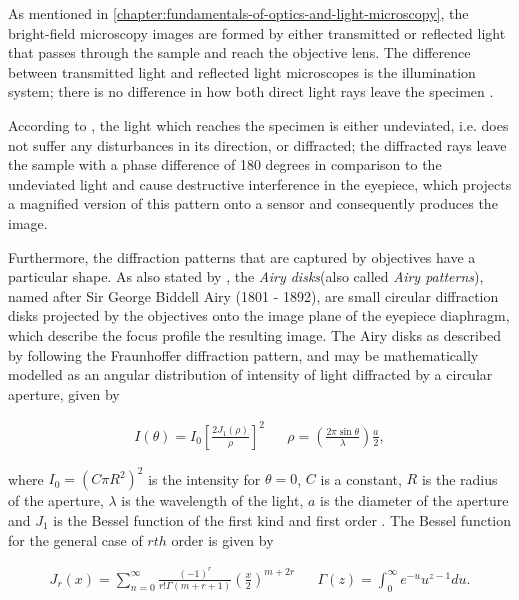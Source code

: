 As mentioned in \autoref{chapter:fundamentals-of-optics-and-light-microscopy}, the bright-field microscopy images are formed by either transmitted or reflected light that passes through the sample and reach the objective lens. The difference between transmitted light and reflected light microscopes is the illumination system; there is no difference in how both direct light rays leave the specimen \cite{leng2009materials}.

According to , the light which reaches the specimen is either undeviated, i.e. does not suffer any disturbances in its direction, or diffracted; the diffracted rays leave the sample with a phase difference of 180 degrees in comparison to the undeviated light and cause destructive interference in the eyepiece, which projects a magnified version of this pattern onto a sensor and consequently produces the image.

Furthermore, the diffraction patterns that are captured by objectives have a particular shape. As also stated by , the \emph{Airy disks}(also called \emph{Airy patterns}), named after Sir George Biddell Airy (1801 - 1892), are small circular diffraction disks projected by the objectives onto the image plane of the eyepiece diaphragm, which describe the focus profile the resulting image. The Airy disks as described by  following the Fraunhoffer diffraction pattern, and may be mathematically modelled as an angular distribution of intensity of light diffracted by a circular aperture, given by

\begin{align}
\label{eqn:airy_function}
I(\theta) = I_{0} 
            \left[ 
            \frac{2 J_{1} (\rho)}{\rho}
            \right]^{2}
&&
\rho = \left( 
        \frac{2 \pi \sin{\theta}}{\lambda}
        \right) \frac{a}{2},
\end{align}

\noindent where $I_{0} = (C \pi R^{2})^{2}$ is the intensity for $\theta = 0$, $C$ is a constant, $R$ is the radius of the aperture, $\lambda$ is the wavelength of the light, $a$ is the diameter of the aperture and $J_{1}$ is the Bessel function of the first kind and first order \cite{mathews1970mathematical}. The Bessel function for the general case of $rth$ order is given by

\begin{align}
\label{eqn:1st_bessel}
J_{r}(x) = \sum_{n = 0}^{\infty}
            \frac{(-1)^{r}}
                 {r! \Gamma(m + r + 1)}
            \left(
                \frac{x}{2}
            \right)^{m + 2r}
&&
\Gamma(z) = \int_{0}^{\infty} e^{-u} u^{z-1}du.
\end{align}


